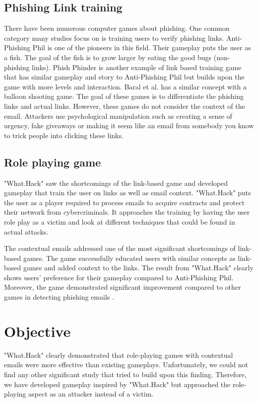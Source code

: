 \subsection{Phishing Link training}
There have been numerous computer games about phishing. One common category many studies focus on is training users to verify phishing links. Anti-Phishing Phil \cite{anti_phishing_phil} is one of the pioneers in this field. Their gameplay puts the user as a fish. The goal of the fish is to grow larger by eating the good bugs (non-phishing links). Phish Phinder \cite{phish_phinder} is another example of link based training game that has similar gameplay and story to Anti-Phishing Phil but builds upon the game with more levels and interaction. Baral et al. \cite{gamified_appraoch} has a similar concept with a balloon shooting game. The goal of these games is to differentiate the phishing links and actual links. However, these games do not consider the context of the email. Attackers use psychological manipulation such as creating a sense of urgency, fake giveaways or making it seem like an email from somebody you know to trick people into clicking these links.

\subsection{Role playing game}
"What.Hack" \cite{what_hack} saw the shortcomings of the link-based game and developed gameplay that train the user on links as well as email context. "What.Hack" puts the user as a player required to process emails to acquire contracts and protect their network from cybercriminals. It approaches the training by having the user role play as a victim and look at different techniques that could be found in actual attacks.

The contextual emails addressed one of the most significant shortcomings of link-based games. The game successfully educated users with similar concepts as link-based games and added context to the links. The result from "What.Hack" clearly shows users' preference for their gameplay compared to Anti-Phishing Phil. Moreover, the game demonstrated significant improvement compared to other games in detecting phishing emails \cite{what_hack}.

\section{Objective}
"What.Hack" clearly demonstrated that role-playing games with contextual emails were more effective than existing gameplays. Unfortunately, we could not find any other significant study that tried to build upon this finding. Therefore, we have developed gameplay inspired by "What.Hack" but approached the role-playing aspect as an attacker instead of a victim.

